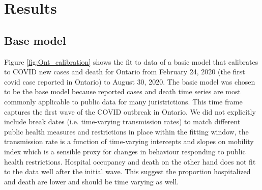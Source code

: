 \documentclass[12pt]{article}\usepackage[]{graphicx}\usepackage[]{color}
\begin{document}

\FloatBarrier

\hypertarget{sec:Results}{}
\section{Results}


\subsection{Base model}

Figure \ref{fig:Ont_calibration} shows the fit to data of a basic model that calibrates to COVID new cases and death for Ontario from February 24, 2020 (the first covid case reported in Ontario) to August 30, 2020. 
The basic model was chosen to be the base model because reported cases and death time series are most commonly applicable to public data for many juristrictions.
This time frame captures the first wave of the COVID outbreak in Ontario. 
We did not explicitly include break dates (i.e. time-varying transmission rates) to match different public health measures and restrictions in place within the fitting window, the transmission rate is a function of time-varying intercepts and slopes on mobility index which is a sensible proxy for changes in behaviour responding to public health restrictions.
Hospital occupancy and death on the other hand does not fit to the data well after the initial wave. This suggest the proportion hospitalized and death are lower and should be time varying as well. 
\end{document}

